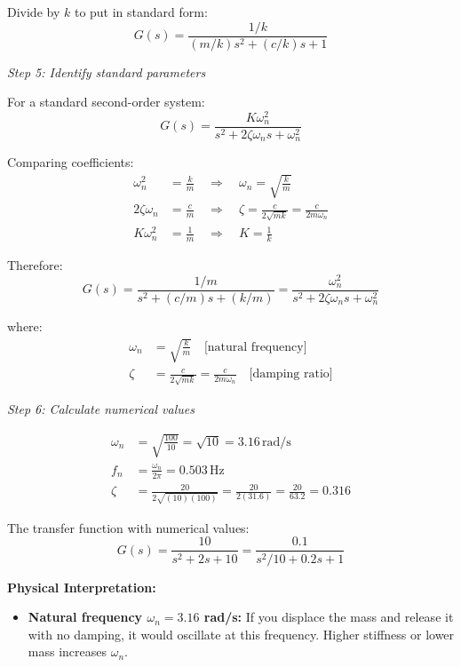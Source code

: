 \begin{example}
Divide by $k$ to put in standard form:
\begin{equation}
G(s) = \frac{1/k}{(m/k)s^2 + (c/k)s + 1}
\end{equation}

\textit{Step 5: Identify standard parameters}

For a standard second-order system:
\begin{equation}
G(s) = \frac{K\omega_n^2}{s^2 + 2\zeta\omega_n s + \omega_n^2}
\end{equation}

Comparing coefficients:
\begin{align}
\omega_n^2 &= \frac{k}{m} \quad \Rightarrow \quad \omega_n = \sqrt{\frac{k}{m}} \\
2\zeta\omega_n &= \frac{c}{m} \quad \Rightarrow \quad \zeta = \frac{c}{2\sqrt{mk}} = \frac{c}{2m\omega_n} \\
K\omega_n^2 &= \frac{1}{m} \quad \Rightarrow \quad K = \frac{1}{k}
\end{align}

Therefore:
\begin{equation}
\boxed{G(s) = \frac{1/m}{s^2 + (c/m)s + (k/m)} = \frac{\omega_n^2}{s^2 + 2\zeta\omega_n s + \omega_n^2}}
\end{equation}

where:
\begin{align}
\omega_n &= \sqrt{\frac{k}{m}} \quad \text{[natural frequency]} \\
\zeta &= \frac{c}{2\sqrt{mk}} = \frac{c}{2m\omega_n} \quad \text{[damping ratio]}
\end{align}

\textit{Step 6: Calculate numerical values}

\begin{align}
\omega_n &= \sqrt{\frac{100}{10}} = \sqrt{10} = 3.16\,\text{rad/s} \\
f_n &= \frac{\omega_n}{2\pi} = 0.503\,\text{Hz} \\
\zeta &= \frac{20}{2\sqrt{(10)(100)}} = \frac{20}{2(31.6)} = \frac{20}{63.2} = 0.316
\end{align}

The transfer function with numerical values:
\begin{equation}
\boxed{G(s) = \frac{10}{s^2 + 2s + 10} = \frac{0.1}{s^2/10 + 0.2s + 1}}
\end{equation}

\textbf{Physical Interpretation:}

\begin{itemize}
    \item \textbf{Natural frequency $\omega_n = 3.16$ rad/s:} If you displace the mass and release it with no damping, it would oscillate at this frequency. Higher stiffness or lower mass increases $\omega_n$.


\end{itemize}
\end{example}
